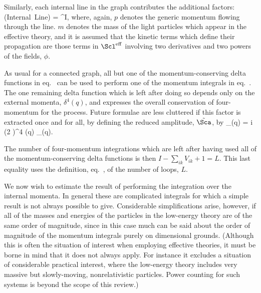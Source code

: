 \documentclass[12pt,epsf]{report}
\def\leff{\Scl^{\rm eff}}
\begin{document}
Similarly, each internal line in the graph contributes the
additional factors:
%
\eq
\label{internallinecont}
\hbox{(Internal Line)} = ^I,
\eeq
%
where, again, $p$ denotes the generic momentum flowing
through the line. $m$ denotes the mass of the light
particles which appear in the effective theory, and it is
assumed that the kinetic terms which define their
propagation are those terms in $\leff$ involving two
derivatives and two powers of the fields, $\phi$.

As usual for a connected graph, all but one of the
momentum-conserving delta functions in
eq.~ can be used to perform one of the
momentum integrals in 
eq.~. The one remaining delta
function which is left after doing so depends only on the
external momenta, $\delta^4(q)$, and expresses the overall
conservation of four-momentum for the process. Future
formulae are less cluttered if this factor is extracted
once and for all, by defining the reduced amplitude,
$\tilde \Sca$, by
%
\eq
\label{redampdef}
\Sca_\sse(q) = i (2 \pi)^4 \delta(q) \; \tilde\Sca_\sse(q).
\eeq

The number of four-momentum integrations which are left
after having used all of the momentum-conserving delta
functions is then $I - \sum_{ik} V_{ik} + 1 = L$. This last
equality uses the definition, eq.~, of the
number of loops, $L$.

We now wish to estimate the result of performing the
integration over the internal momenta. In general these
are complicated integrals for which a simple result is not
always possible to give. Considerable simplifications arise,
however, if all of the masses and energies of the
particles in the low-energy theory are of the same order
of magnitude, since in this case much can be said about
the order of magnitude of the momentum integrals purely on 
dimensional grounds. (Although this is often the situation
of interest when employing effective theories, it must be
borne in mind that it does not always apply. For instance
it excludes a situation of considerable practical interest, 
where the low-energy theory includes very massive but 
slowly-moving, nonrelativistic particles. Power counting
for such systems is beyond the scope of this review.)
\end{document}

